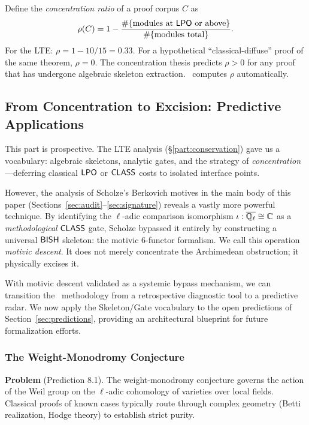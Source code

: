 \begin{observation}
Define the \emph{concentration ratio} of a proof corpus $C$ as
\[
  \rho(C) = 1 - \frac{\#\{\text{modules at } \textsf{LPO} \text{ or above}\}}
                      {\#\{\text{modules total}\}}.
\]
For the LTE: $\rho = 1 - 10/15 = 0.33$.  For a hypothetical
``classical-diffuse'' proof of the same theorem, $\rho = 0$.
The concentration thesis predicts $\rho > 0$ for any proof that
has undergone algebraic skeleton extraction.  \CRMlint\ computes
$\rho$ automatically.
\end{observation}


\subsection{From Concentration to Excision: Predictive Applications}\label{part:strategy}

This part is prospective. The LTE analysis (\S\ref{part:conservation}) gave us a vocabulary: algebraic skeletons, analytic gates, and the strategy of \emph{concentration}---deferring classical $\textsf{LPO}$ or $\textsf{CLASS}$ costs to isolated interface points.

However, the analysis of Scholze's Berkovich motives in the main body of this paper (Sections~\ref{sec:audit}--\ref{sec:signature}) reveals a vastly more powerful technique. By identifying the $\ell$-adic comparison isomorphism $\iota: \overline{\mathbb{Q}_\ell} \cong \mathbb{C}$ as a \emph{methodological} $\textsf{CLASS}$ gate, Scholze bypassed it entirely by constructing a universal $\textsf{BISH}$ skeleton: the motivic 6-functor formalism. We call this operation \emph{motivic descent}. It does not merely concentrate the Archimedean obstruction; it physically excises it.

With motivic descent validated as a systemic bypass mechanism, we can transition the \CRMlint\ methodology from a retrospective diagnostic tool to a predictive radar. We now apply the Skeleton/Gate vocabulary to the open predictions of Section~\ref{sec:predictions}, providing an architectural blueprint for future formalization efforts.

\subsubsection{The Weight-Monodromy Conjecture}\label{sec:predict-weight}

\noindent\textbf{Problem} (Prediction 8.1). The weight-monodromy conjecture governs the action of the Weil group on the $\ell$-adic cohomology of varieties over local fields. Classical proofs of known cases typically route through complex geometry (Betti realization, Hodge theory) to establish strict purity.

